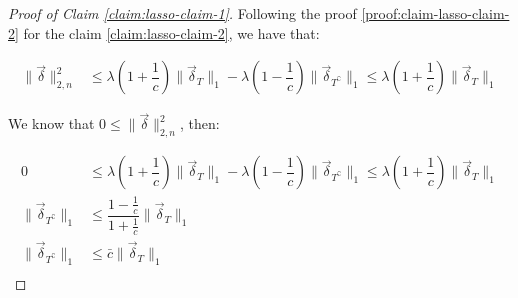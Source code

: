 \begin{proof}[Proof of Claim \ref{claim:lasso-claim-1}]
Following the proof \ref{proof:claim-lasso-claim-2} for the claim \ref{claim:lasso-claim-2}, we have that:

\begin{align*}
    \|\Vec{\delta}\|_{2, n}^{2}
    &\leq
    \lambda \left(
        1 + \dfrac{1}{c}
    \right) \|\Vec{\delta}_T\|_{1} -
    \lambda \left(
        1 - \dfrac{1}{c}
    \right) \|\Vec{\delta}_{T^\complement}\|_{1}
    \leq
    \lambda \left(
        1 + \dfrac{1}{c}
    \right) \| \Vec{\delta}_T \|_{1}
\end{align*}

We know that $ 0 \leq \|\Vec{\delta}\|_{2, n}^{2}$, then:

\begin{align*}
    0
    &\leq
    \lambda \left(
        1 + \dfrac{1}{c}
    \right) \|\Vec{\delta}_T\|_{1} -
    \lambda \left(
        1 - \dfrac{1}{c}
    \right) \|\Vec{\delta}_{T^\complement}\|_{1}
    \leq
    \lambda \left(
        1 + \dfrac{1}{c}
    \right) \| \Vec{\delta}_T \|_{1}\\
    \| \Vec{\delta}_{T^\complement} \|_{1}
    &\leq 
    \dfrac{1 - \frac{1}{c}}{1 + \frac{1}{c}} \| \Vec{\delta}_T \|_{1}\\
    \| \Vec{\delta}_{T^\complement} \|_{1}
    &\leq 
    \bar{c} \| \Vec{\delta}_T \|_{1}\\
\end{align*}
\end{proof}

